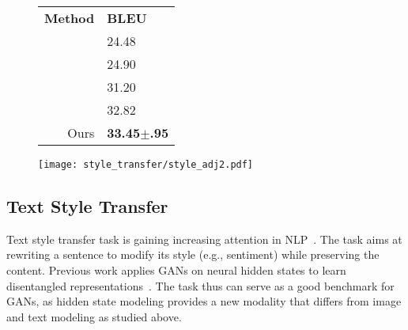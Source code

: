 \documentclass{article}
\newcommand{\0}{\bm{0}}
\begin{document}
\begin{figure*}
\begin{minipage}{0.34\textwidth}
\small
  \centering
  \begin{tabular}{@{}rl@{}}
    \toprule
    {\bf Method} &  {\bf BLEU} \\
    \cmidrule{1-2}
    \citet{zhang2018style} & 24.48 \\
    \citet{tian2018structured} & 24.90 \\
    \citet{subramanian2018multiple} & 31.20 \\
    \citet{tikhonov2019style} & 32.82 \\\cmidrule{1-2}
    Ours & \textbf{33.45$\pm$.95}\\
    \bottomrule
  \end{tabular}
   \label{tab:styletransfer_tbl2}
\vspace{-20pt}
\end{minipage}
\hfill
\begin{minipage}{0.64\textwidth}
\begin{center}
\centerline{\texttt{[image: style\_transfer/style\_adj2.pdf]}}
\vspace{-10pt}
\label{fig:styletransfer_img}
\end{center}
\end{minipage}
\vspace{-20pt}
\end{figure*}


\subsection{Text Style Transfer}\label{sec:exp:style}
Text style transfer task is gaining increasing attention in NLP~\cite{hu2017toward,shen2017style,yang2018unsupervised}. The task aims at rewriting a sentence to modify its style (e.g., sentiment) while preserving the content. Previous work applies GANs on neural hidden states to learn disentangled representations~\cite{shen2017style,tikhonov2019style}. The task thus can serve as a good benchmark for GANs, as hidden state modeling provides a new modality that differs from image and text modeling as studied above.
\end{document}

